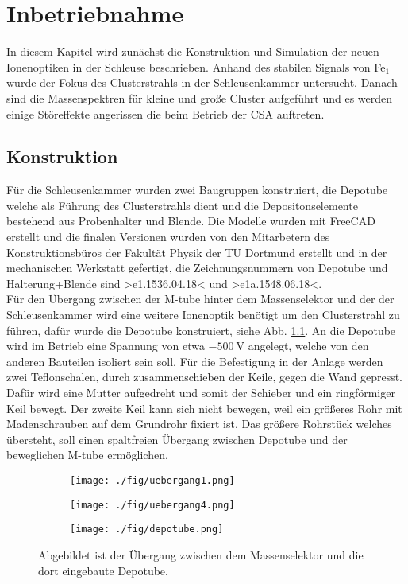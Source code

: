 \chapter{Inbetriebnahme}
\label{sec:inbetriebnahme}
In diesem Kapitel wird zunächst die Konstruktion und Simulation der neuen Ionenoptiken in der Schleuse beschrieben.
Anhand des stabilen Signals von Fe$_1$ wurde der Fokus des Clusterstrahls in der Schleusenkammer untersucht.
Danach sind die Massenspektren für kleine und große Cluster aufgeführt und es werden einige Störeffekte angerissen die beim Betrieb der CSA auftreten.
\section{Konstruktion}
Für die Schleusenkammer wurden zwei Baugruppen konstruiert, die Depotube welche als Führung des Clusterstrahls dient und die Depositonselemente bestehend aus Probenhalter und Blende. Die Modelle wurden mit FreeCAD\cite{freecad} erstellt und die finalen Versionen wurden von den Mitarbetern des Konstruktionsbüros der Fakultät Physik der TU Dortmund erstellt \cite{konstruktion} und in der mechanischen Werkstatt gefertigt, die Zeichnungsnummern von Depotube und Halterung+Blende sind >e1.1536.04.18< und >e1a.1548.06.18<.\\

Für den Übergang zwischen der M-tube hinter dem Massenselektor und der der Schleusenkammer wird eine weitere Ionenoptik benötigt um den Clusterstrahl zu führen, dafür wurde die Depotube konstruiert, siehe Abb. \ref{fig:depotube}.
An die Depotube wird im Betrieb eine Spannung von etwa $\SI{-500}{\volt}$ angelegt, welche von den anderen Bauteilen isoliert sein soll.
Für die Befestigung in der Anlage werden zwei Teflonschalen, durch zusammenschieben der Keile, gegen die Wand gepresst.
Dafür wird eine Mutter aufgedreht und somit der Schieber und ein ringförmiger Keil bewegt.
Der zweite Keil kann sich nicht bewegen, weil ein größeres Rohr mit Madenschrauben auf dem Grundrohr fixiert ist.
Das größere Rohrstück welches übersteht, soll einen spaltfreien Übergang zwischen Depotube und der beweglichen M-tube ermöglichen.

\begin{figure}
  \begin{subfigure}[h]{1\textwidth}
    \texttt{[image: ./fig/uebergang1.png]}
  \end{subfigure}\hfill
  \begin{subfigure}[h]{1\textwidth}
    \texttt{[image: ./fig/uebergang4.png]}
  \end{subfigure}\hfill
  \begin{subfigure}[h]{1\textwidth}
    \texttt{[image: ./fig/depotube.png]}
  \end{subfigure}
  \caption{Abgebildet ist der Übergang zwischen dem Massenselektor und die dort eingebaute Depotube.}
  \label{fig:depotube}
\end{figure}

